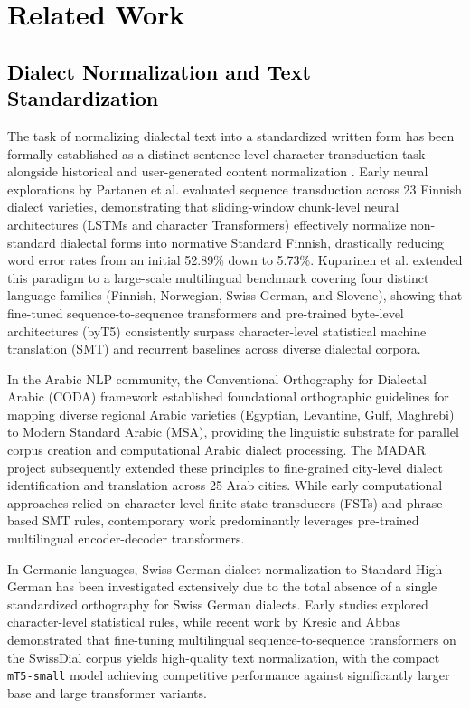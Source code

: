 \section{\textcolor{black}{Related Work}}
\label{sec:related}

\subsection{\textcolor{black}{Dialect Normalization and Text Standardization}}

The task of normalizing dialectal text into a standardized written form has been formally established as a distinct sentence-level character transduction task alongside historical and user-generated content normalization \cite{kuparinen2023dialect}. Early neural explorations by Partanen et al. \cite{partanen2019dialect} evaluated sequence transduction across 23 Finnish dialect varieties, demonstrating that sliding-window chunk-level neural architectures (LSTMs and character Transformers) effectively normalize non-standard dialectal forms into normative Standard Finnish, drastically reducing word error rates from an initial 52.89\% down to 5.73\%. Kuparinen et al. \cite{kuparinen2023dialect} extended this paradigm to a large-scale multilingual benchmark covering four distinct language families (Finnish, Norwegian, Swiss German, and Slovene), showing that fine-tuned sequence-to-sequence transformers and pre-trained byte-level architectures (byT5) consistently surpass character-level statistical machine translation (SMT) and recurrent baselines across diverse dialectal corpora.

In the Arabic NLP community, the Conventional Orthography for Dialectal Arabic (CODA) framework \cite{habash2012coda} established foundational orthographic guidelines for mapping diverse regional Arabic varieties (Egyptian, Levantine, Gulf, Maghrebi) to Modern Standard Arabic (MSA), providing the linguistic substrate for parallel corpus creation and computational Arabic dialect processing. The MADAR project subsequently extended these principles to fine-grained city-level dialect identification and translation across 25 Arab cities. While early computational approaches relied on character-level finite-state transducers (FSTs) and phrase-based SMT rules, contemporary work predominantly leverages pre-trained multilingual encoder-decoder transformers.

In Germanic languages, Swiss German dialect normalization to Standard High German has been investigated extensively due to the total absence of a single standardized orthography for Swiss German dialects. Early studies explored character-level statistical rules, while recent work by Kresic and Abbas \cite{kresic2024normalizing} demonstrated that fine-tuning multilingual sequence-to-sequence transformers on the SwissDial corpus yields high-quality text normalization, with the compact \texttt{mT5-small} model achieving competitive performance against significantly larger base and large transformer variants.

